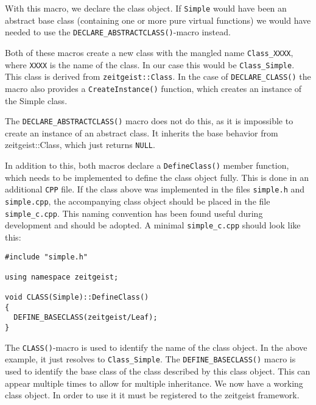 With this macro, we declare the class object. If \texttt{Simple} would
have been an abstract base class (containing one or more pure virtual
functions) we would have needed to use the
\texttt{DECLARE\_ABSTRACTCLASS()}-macro instead. 

Both of these macros create a new class with the mangled name
\texttt{Class\_XXXX}, where \texttt{XXXX} is the name of the class. 
In our case this would be \texttt{Class\_Simple}. This class is derived
from \texttt{zeitgeist::Class}. In the case of
\texttt{DECLARE\_CLASS()} the macro also provides a \texttt{CreateInstance()}
function, which creates an instance of the Simple class. 

The \texttt{DECLARE\_ABSTRACTCLASS()} macro does not do this, as it is
impossible to create an instance of an abstract class. It inherits the
base behavior from zeitgeist::Class, which just returns
\texttt{NULL}. 

In addition to this, both macros declare a \texttt{DefineClass()}
member function, which needs to be implemented to define the class
object fully. This is done in an additional \texttt{CPP} file. If the
class above was implemented in the files \texttt{simple.h} and
\texttt{simple.cpp}, the accompanying class object should be placed in
the file \texttt{simple\_c.cpp}. This naming convention has been found
useful during development and should be adopted. A minimal
\texttt{simple\_c.cpp} should look like this:

\begin{verbatim}
#include "simple.h"

using namespace zeitgeist;

void CLASS(Simple)::DefineClass()
{
  DEFINE_BASECLASS(zeitgeist/Leaf);
}
\end{verbatim}


The \texttt{CLASS()}-macro is used to identify the name of the class
object. In the above example, it just resolves to
\texttt{Class\_Simple}. The \texttt{DEFINE\_BASECLASS()} macro is used to 
identify the base class of the class described by this class
object. This can appear multiple times to allow for multiple
inheritance. We now have a working class object. In order to use it it
must be registered to the zeitgeist framework.


